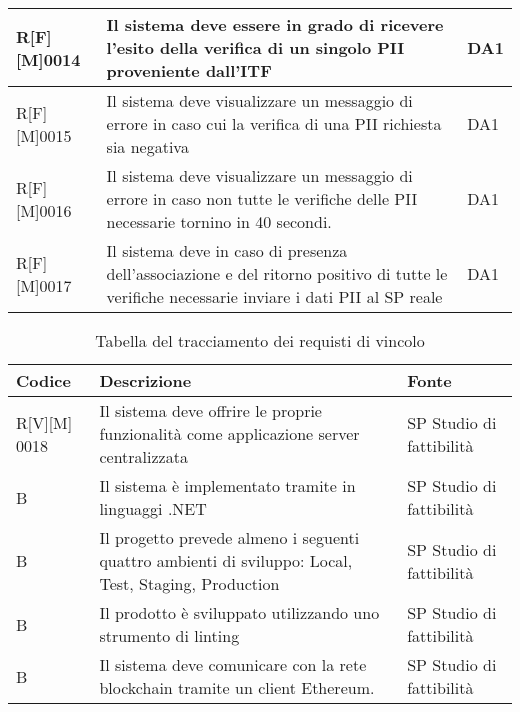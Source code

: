 \begin{center}
\begin{longtable}{|p{2cm}|p{9cm}|p{2cm}|}
\hline
R[F][M]0014     & Il sistema deve essere in grado di ricevere l’esito della verifica di un singolo PII proveniente dall’ITF  & DA1 \\
\hline
R[F][M]0015     & Il sistema deve visualizzare un messaggio di errore in caso cui la verifica di una PII richiesta sia negativa & DA1 \\
\hline
R[F][M]0016     & Il sistema deve visualizzare un messaggio di errore in caso non tutte le verifiche delle PII necessarie tornino in 40 secondi. & DA1 \\
\hline
R[F][M]0017     & Il sistema deve in caso di presenza dell’associazione e del ritorno positivo di tutte le verifiche necessarie inviare i dati PII al SP reale & DA1 \\
\hline
\end{longtable}
\end{center}






\begin{center}
    \begin{longtable}{|p{2cm}|p{9cm}|p{2cm}|}%
    \caption{Tabella del tracciamento dei requisti di vincolo}
    \label{tab:requisiti-vincolo-sp}
    \endfirsthead
    \endhead
    \hline
    \textbf{Codice} & \textbf{Descrizione} & \textbf{Fonte}\\
    \hline
    R[V][M] 0018     & Il sistema deve offrire le proprie funzionalità come applicazione server centralizzata & SP Studio di fattibilità \\
    \hline
    B     & Il sistema è implementato tramite in linguaggi .NET & SP Studio di fattibilità \\
    \hline
    B     & Il progetto prevede almeno i seguenti quattro ambienti di sviluppo: Local, Test, Staging, Production & SP Studio di fattibilità \\
    \hline
    B     & Il prodotto è sviluppato utilizzando uno strumento di linting & SP Studio di fattibilità \\
    \hline
    B     & Il sistema deve comunicare con la rete blockchain tramite un client Ethereum. & SP Studio di fattibilità \\
    \hline
    \end{longtable}
    \end{center}



